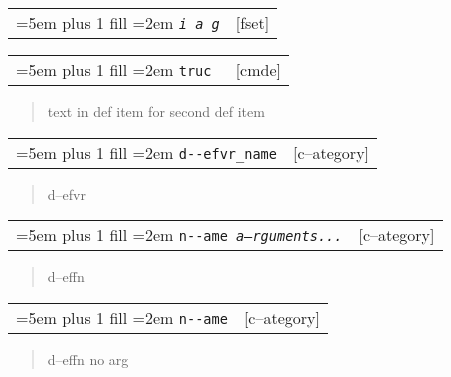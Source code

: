 \documentclass{book}
\newcommand\GNUTexinfocommandstyletextvar[1]{{\normalfont{}\textsl{#1}}}%
\begin{document}
\begin{titlepage}
%


\noindent\begin{tabularx}{\linewidth}{@{}Xr}
\rightskip=5em plus 1 fill
\hangindent=2em
\texttt{\GNUTexinfocommandstyletextvar{i} \EmbracOn{}\textnormal{\textsl{a g}}\EmbracOff{}}& [fset]
\end{tabularx}

\index[fn]{i@\texttt{\GNUTexinfocommandstyletextvar{i}}}%

\noindent\begin{tabularx}{\linewidth}{@{}Xr}
\rightskip=5em plus 1 fill
\hangindent=2em
\texttt{truc \EmbracOn{}\textnormal{\textsl{}}\EmbracOff{}}& [cmde]
\end{tabularx}

%
\begin{quote}
\unskip{\parskip=0pt\noindent}%
text in def item for second def item
\end{quote}



\noindent\begin{tabularx}{\linewidth}{@{}Xr}
\rightskip=5em plus 1 fill
\hangindent=2em
\texttt{d{-}{-}efvr\_name}& [c--ategory]
\end{tabularx}

%
\begin{quote}
\unskip{\parskip=0pt\noindent}%
d--efvr
\end{quote}


\noindent\begin{tabularx}{\linewidth}{@{}Xr}
\rightskip=5em plus 1 fill
\hangindent=2em
\texttt{n{-}{-}ame \EmbracOn{}\textnormal{\textsl{a--rguments...}}\EmbracOff{}}& [c--ategory]
\end{tabularx}

%
\begin{quote}
\unskip{\parskip=0pt\noindent}%
d--effn
\end{quote}


\noindent\begin{tabularx}{\linewidth}{@{}Xr}
\rightskip=5em plus 1 fill
\hangindent=2em
\texttt{n{-}{-}ame}& [c--ategory]
\end{tabularx}

%
\begin{quote}
\unskip{\parskip=0pt\noindent}%
d--effn no arg
\end{quote}



\end{titlepage}
\end{document}
